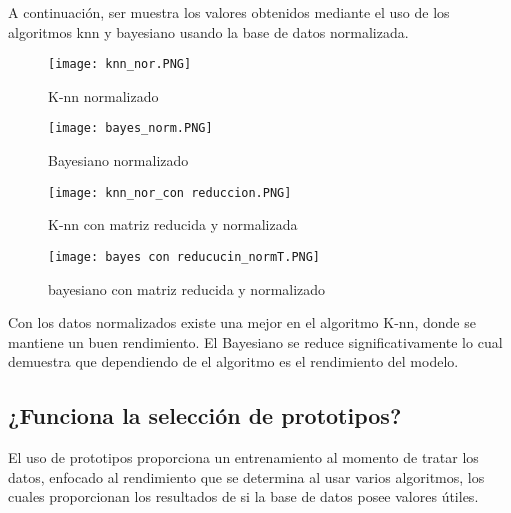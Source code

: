 \documentclass[10pt,a4paper]{article}
\begin{document}
A continuación, ser muestra los valores obtenidos mediante el uso de los algoritmos knn y bayesiano usando la base de datos normalizada.
\begin{multicols}{2}
\begin{figure}[H]
\centering
\texttt{[image: knn\_nor.PNG]}
\caption{K-nn normalizado}
\end{figure}
\begin{figure}[H]
\centering
\texttt{[image: bayes\_norm.PNG]}
\caption{Bayesiano normalizado}
\end{figure}
\begin{figure}[H]
\centering
\texttt{[image: knn\_nor\_con reduccion.PNG]}
\caption{K-nn con matriz reducida y normalizada}
\end{figure}
\begin{figure}[H]
\centering
\texttt{[image: bayes con reducucin\_normT.PNG]}
\caption{bayesiano con matriz reducida y normalizado}
\end{figure}
\end{multicols}

Con los datos normalizados existe una mejor en el algoritmo K-nn, donde se mantiene un buen rendimiento. El Bayesiano se reduce significativamente lo cual demuestra que dependiendo de el algoritmo es el rendimiento del modelo. 
\subsection{¿Funciona la selección de prototipos?}
El uso de prototipos proporciona un entrenamiento al momento de tratar los datos, enfocado al rendimiento que se determina al usar varios algoritmos, los cuales proporcionan los resultados de si la base de datos posee valores útiles.  
\end{document}
